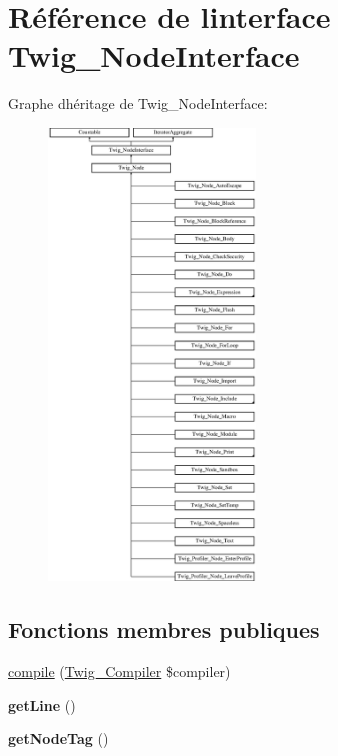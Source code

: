 \hypertarget{interface_twig___node_interface}{}\section{Référence de l\textquotesingle{}interface Twig\+\_\+\+Node\+Interface}
\label{interface_twig___node_interface}
Graphe d\textquotesingle{}héritage de Twig\+\_\+\+Node\+Interface\+:\begin{figure}[H]
\begin{center}
\leavevmode
\includegraphics[height=12.000000cm]{interface_twig___node_interface}
\end{center}
\end{figure}
\subsection*{Fonctions membres publiques}
\begin{DoxyCompactItemize}
\item 
\hyperlink{interface_twig___node_interface_a4e0faa87c3fae583620b84d3607085da}{compile} (\hyperlink{class_twig___compiler}{Twig\+\_\+\+Compiler} \$compiler)
\item 
{\bfseries get\+Line} ()\hypertarget{interface_twig___node_interface_aef9c32f6066788a101028a1d4150f8cb}{}\label{interface_twig___node_interface_aef9c32f6066788a101028a1d4150f8cb}

\item 
{\bfseries get\+Node\+Tag} ()\hypertarget{interface_twig___node_interface_ade3006d746f2e1ba1df08da2d613a632}{}\label{interface_twig___node_interface_ade3006d746f2e1ba1df08da2d613a632}

\end{DoxyCompactItemize}


